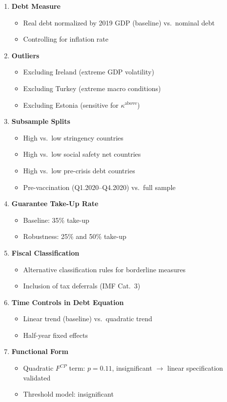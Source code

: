 \documentclass[12pt, a4paper]{article}
\begin{document}
\begin{enumerate}[resume]
\item \textbf{Debt Measure}
\begin{itemize}
    \item Real debt normalized by 2019 GDP (baseline) vs.\ nominal debt
    \item Controlling for inflation rate
\end{itemize}

\item \textbf{Outliers}
\begin{itemize}
    \item Excluding Ireland (extreme GDP volatility)
    \item Excluding Turkey (extreme macro conditions)
    \item Excluding Estonia (sensitive for $\kappa^{\text{above}}$)
\end{itemize}

\item \textbf{Subsample Splits}
\begin{itemize}
    \item High vs.\ low stringency countries
    \item High vs.\ low social safety net countries
    \item High vs.\ low pre-crisis debt countries
    \item Pre-vaccination (Q1.2020--Q4.2020) vs.\ full sample
\end{itemize}

\item \textbf{Guarantee Take-Up Rate}
\begin{itemize}
    \item Baseline: 35\% take-up
    \item Robustness: 25\% and 50\% take-up
\end{itemize}

\item \textbf{Fiscal Classification}
\begin{itemize}
    \item Alternative classification rules for borderline measures
    \item Inclusion of tax deferrals (IMF Cat.\ 3)
\end{itemize}

\item \textbf{Time Controls in Debt Equation}
\begin{itemize}
    \item Linear trend (baseline) vs.\ quadratic trend
    \item Half-year fixed effects
\end{itemize}

\item \textbf{Functional Form}
\begin{itemize}
    \item Quadratic $F^{CP}$ term: $p = 0.11$, insignificant $\to$
        linear specification validated
    \item Threshold model: insignificant
\end{itemize}

\end{enumerate}
\end{document}
